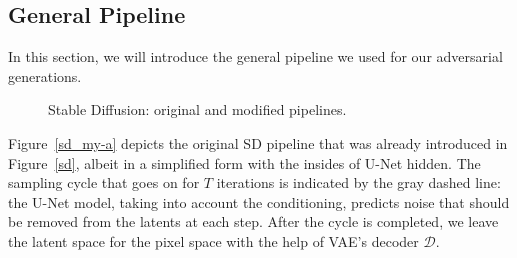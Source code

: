 
\subsection{General Pipeline}

In this section, we will introduce the general pipeline we used for our adversarial generations.

\begin{figure}[ht!]
\centering
{}
\caption{Stable Diffusion: original and modified pipelines.}
\label{sd_my}
\end{figure}

Figure~\ref{sd_my-a} depicts the original SD pipeline that was already introduced in Figure~\ref{sd}, albeit in a simplified form with the insides of U-Net hidden.
The sampling cycle that goes on for $T$ iterations is indicated by the gray dashed line: the U-Net model, taking into account the conditioning, predicts noise that should be removed from the latents at each step. 
After the cycle is completed, we leave the latent space for the pixel space with the help of VAE's decoder $\mathcal{D}$.

